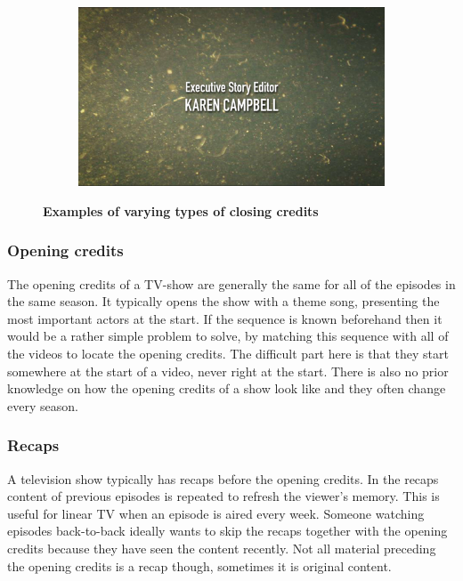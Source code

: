 \documentclass{article}
\begin{document}
\begin{figure}[H]
\begin{subfigure}[b]{0.4\textwidth}
\end{subfigure}
\begin{subfigure}[b]{0.4\textwidth}
	\includegraphics[width=\textwidth]{images/diffcredits2.png}
\end{subfigure}
  \caption{\textbf{Examples of varying types of closing credits}}
  \label{closingcredits}
\end{figure}

\subsubsection{Opening credits}
The opening credits of a TV-show are generally the same for all of the episodes in the same season. It typically opens the show with a theme song, presenting the most important actors at the start. If the sequence is known beforehand then it would be a rather simple problem to solve, by matching this sequence with all of the videos to locate the opening credits. The difficult part here is that they start somewhere at the start of a video, never right at the start. There is also no prior knowledge on how the opening credits of a show look like and they often change every season.

\subsubsection{Recaps}
A television show typically has recaps before the opening credits. In the recaps content of previous episodes is repeated to refresh the viewer's memory. This is useful for linear TV when an episode is aired every week. Someone watching episodes back-to-back ideally wants to skip the recaps together with the opening credits because they have seen the content recently. Not all material preceding the opening credits is a recap though, sometimes it is original content.
\end{document}
